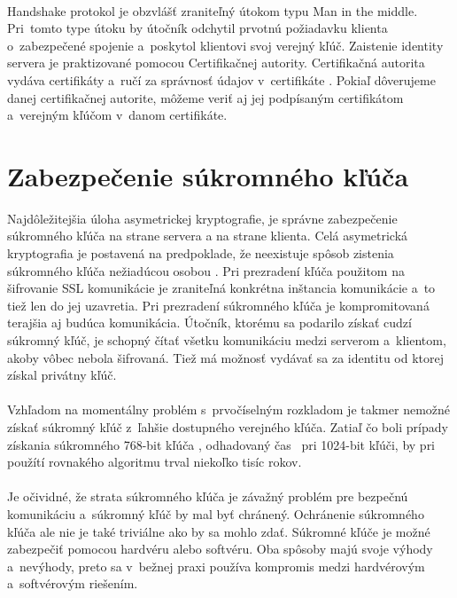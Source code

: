 \documentclass[
  printed, %
  table,   %
oneside,
  nolof,     %
  nolot,     %
]{fithesis3}
\begin{document}
\paragraph{}
Handshake protokol je obzvlášť zraniteľný  útokom typu Man in the middle. Pri~tomto type útoku by útočník odchytil prvotnú požiadavku klienta o~zabezpečené spojenie a~poskytol klientovi svoj verejný kľúč. Zaistenie identity servera je praktizované pomocou Certifikačnej autority.  Certifikačná autorita vydáva certifikáty a~ručí za správnosť údajov v~certifikáte \cite{certificateAuth}. Pokiaľ dôverujeme danej certifikačnej autorite, môžeme veriť aj jej podpísaným certifikátom  a~verejným kľúčom v~danom certifikáte. 
\section{Zabezpečenie súkromného kľúča }
Najdôležitejšia úloha asymetrickej kryptografie, je správne zabezpečenie súkromného kľúča na strane servera a na strane klienta.
Celá asymetrická kryptografia je postavená na predpoklade, že neexistuje spôsob zistenia súkromného kľúča nežiadúcou osobou \cite{ssl}. 
Pri prezradení kľúča použitom na šifrovanie SSL komunikácie je zraniteľná konkrétna inštancia komunikácie a~to tiež len do jej uzavretia. Pri prezradení súkromného kľúča je kompromitovaná terajšia aj budúca komunikácia. Útočník, ktorému sa podarilo získať cudzí súkromný kľúč, je schopný čítať všetku komunikáciu medzi serverom a~klientom, akoby vôbec nebola šifrovaná. Tiež má možnosť vydávať sa za identitu od ktorej získal privátny kľúč.\paragraph{}
Vzhľadom na momentálny problém s~prvočíselným rozkladom je takmer nemožné získať súkromný kľúč z~ľahšie dostupného verejného kľúča. Zatiaľ čo boli prípady získania súkromného 768-bit kľúča \cite{crypt768}, odhadovaný čas~ pri 1024-bit kľúči, by pri  použítí rovnakého algoritmu trval niekoľko tisíc rokov. \paragraph{}
Je očividné, že strata súkromného kľúča je závažný problém pre bezpečnú komunikáciu a~súkromný kľúč by mal byť chránený. Ochránenie súkromného kľúča ale nie je také triviálne ako by sa mohlo zdať. Súkromné kľúče je možné zabezpečiť pomocou hardvéru alebo softvéru. Oba spôsoby majú svoje výhody a~nevýhody, preto sa  v~bežnej praxi používa kompromis medzi hardvérovým a~softvérovým riešením.
\end{document}
